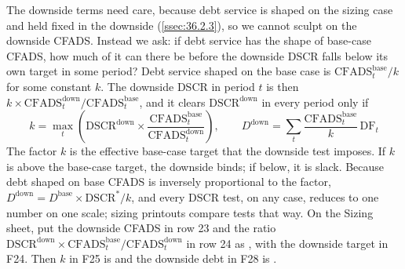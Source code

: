 The downside terms need care, because debt service is shaped on the sizing case and held fixed in the downside (\cref{ssec:36.2.3}), so we cannot sculpt on the downside CFADS. Instead we ask: if debt service has the shape of base-case CFADS, how much of it can there be before the downside DSCR falls below its own target in some period? Debt service shaped on the base case is $\mathrm{CFADS}^{\mathrm{base}}_t/k$ for some constant $k$. The downside DSCR in period $t$ is then $k \times \mathrm{CFADS}^{\mathrm{down}}_t / \mathrm{CFADS}^{\mathrm{base}}_t$, and it clears $\mathrm{DSCR}^{\mathrm{down}}$ in every period only if
\begin{equation}\label{eq:36.5}
k = \max_t \left( \mathrm{DSCR}^{\mathrm{down}} \times \frac{\mathrm{CFADS}^{\mathrm{base}}_t}{\mathrm{CFADS}^{\mathrm{down}}_t} \right), \qquad D^{\mathrm{down}} = \sum_t \frac{\mathrm{CFADS}^{\mathrm{base}}_t}{k}\,\mathrm{DF}_t
\end{equation}
The factor $k$ is the effective base-case target that the downside test imposes. If $k$ is above the base-case target, the downside binds; if below, it is slack. Because debt shaped on base CFADS is inversely proportional to the factor, $D^{\mathrm{down}} = D^{\mathrm{base}} \times \mathrm{DSCR}^{*}/k$, and every DSCR test, on any case, reduces to one number on one scale; sizing printouts compare tests that way. On the Sizing sheet, put the downside CFADS in row 23 and the ratio $\mathrm{DSCR}^{\mathrm{down}} \times \mathrm{CFADS}^{\mathrm{base}}_t / \mathrm{CFADS}^{\mathrm{down}}_t$ in row 24 as , with the downside target in F24. Then $k$ in F25 is  and the downside debt in F28 is .

